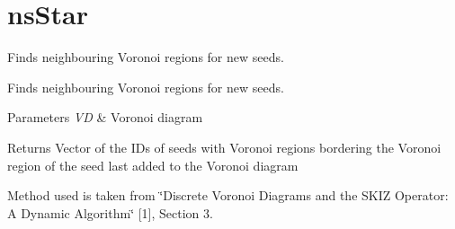 \hypertarget{group__nsStar}{}\section{ns\+Star}
\label{group__nsStar}


Finds neighbouring Voronoi regions for new seeds.  


Finds neighbouring Voronoi regions for new seeds. 


\begin{DoxyParams}{Parameters}
{\em VD} & Voronoi diagram \\
\hline
\end{DoxyParams}
\begin{DoxyReturn}{Returns}
Vector of the I\+Ds of seeds with Voronoi regions bordering the Voronoi region of the seed last added to the Voronoi diagram
\end{DoxyReturn}
Method used is taken from \char`\"{}\+Discrete Voronoi Diagrams and the S\+K\+I\+Z
 Operator\+: A Dynamic Algorithm\char`\"{} \mbox{[}1\mbox{]}, Section 3. 
